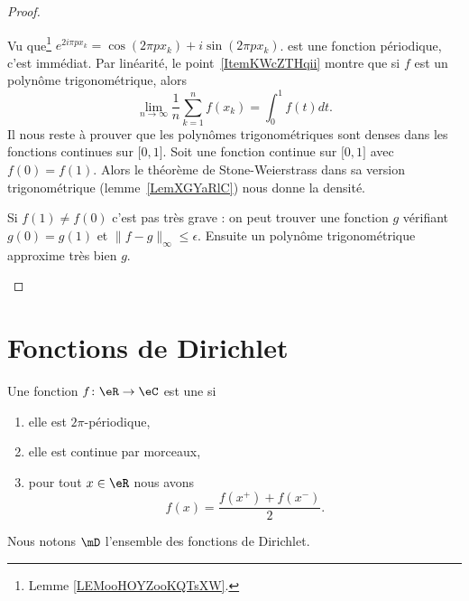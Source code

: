 \begin{proof}
\begin{subproof}
		\spitem[\ref{ItemKWcZTHqii}\( \Rightarrow\)\ref{ItemKWcZTHqiii}]
		Vu que\footnote{Lemme \ref{LEMooHOYZooKQTsXW}.} \( e^{2i\pi px_k}=\cos(2\pi px_k)+i\sin(2\pi px_k)\). est une fonction périodique, c'est immédiat.
		\spitem[\ref{ItemKWcZTHqiii}\( \Rightarrow\)\ref{ItemKWcZTHqii}]
		Par linéarité, le point~\ref{ItemKWcZTHqii} montre que si \( f\) est un polynôme trigonométrique, alors
		\begin{equation}
			\lim_{n\to \infty} \frac{1}{ n }\sum_{k=1}^nf(x_k)=\int_0^1f(t)dt.
		\end{equation}
		Il nous reste à prouver que les polynômes trigonométriques sont denses dans les fonctions continues sur \( \mathopen[ 0 , 1 \mathclose]\). Soit une fonction continue sur \( \mathopen[ 0 , 1 \mathclose]\) avec \( f(0)=f(1)\). Alors le théorème de Stone-Weierstrass dans sa version trigonométrique (lemme~\ref{LemXGYaRlC}) nous donne la densité.

		Si \( f(1)\neq f(0)\) c'est pas très grave : on peut trouver une fonction \( g\) vérifiant \( g(0)=g(1) \) et \( \| f-g \|_{\infty}\leq \epsilon\). Ensuite un polynôme trigonométrique approxime très bien \( g\).
	\end{subproof}
\end{proof}

\section{Fonctions de Dirichlet}

\begin{definition}
	Une fonction \( f\colon \eR\to \eC\) est une  si
	\begin{enumerate}
		\item
		      elle est \( 2\pi\)-périodique,
		\item
		      elle est continue par morceaux,
		\item
		      pour tout \( x\in \eR\) nous avons
		      \begin{equation}
			      f(x)=\frac{ f(x^+)+f(x^-) }{2}.
		      \end{equation}
	\end{enumerate}
	Nous notons \( \mD\) l'ensemble des fonctions de Dirichlet.
\end{definition}

